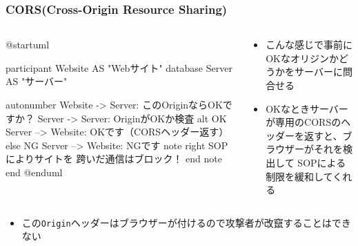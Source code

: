 \begin{frame}[fragile]
  \frametitle{CORS(Cross-Origin Resource Sharing)}

  \pause
  \begin{columns}
    \begin{column}{.55\textwidth}
      \begin{minipage}{\textwidth}
        \begin{plantuml}
          @startuml
          
          participant Website AS "Webサイト"
          database Server AS "サーバー"
       
          autonumber
          Website -> Server: このOriginならOKですか？
          Server -> Server: OriginがOKか検査
          alt OK
            Server --> Website: OKです（CORSヘッダー返す）
          else NG
            Server --> Website: NGです
            note right
              SOPによりサイトを
              跨いだ通信はブロック！
            end note
          end
          @enduml
        \end{plantuml}
      \end{minipage}
    \end{column}
    \begin{column}{.45\textwidth}        
      \begin{itemize}
        \item {}こんな感じで事前にOKなオリジンかどうかをサーバーに問合せる

        \item OKなときサーバーが専用のCORSのヘッダーを返すと、ブラウザーがそれを検出して
        SOPによる制限を緩和してくれる
      \end{itemize}
    \end{column}
  \end{columns}

  \begin{itemize}
    \item この\lstinline|Origin|ヘッダーはブラウザーが付けるので攻撃者が改竄することはできない
  \end{itemize}
\end{frame}

